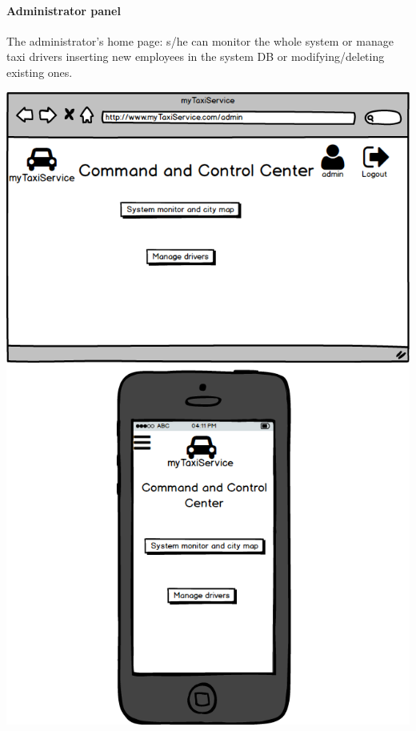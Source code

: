 \documentclass[a4paper,11pt]{report} %
\begin{document}
	\paragraph{Administrator panel} The administrator's home page: s/he can monitor the whole system or manage taxi drivers inserting new employees in the system DB or modifying/deleting existing ones.
	\begin{center}
		\includegraphics[width=0.9\linewidth]{Pictures/AdminPage}
	\end{center}
	\pagebreak	
	
\end{document}
